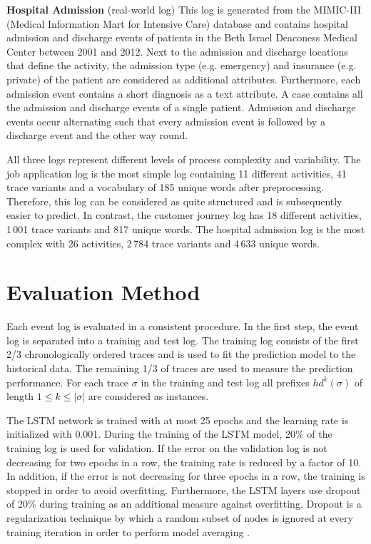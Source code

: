 \textbf{Hospital Admission} (real-world log) This log is generated from the MIMIC-III (Medical Information Mart for Intensive Care) database \cite{johnson2016mimic} and contains hospital admission and discharge events of patients in the Beth Israel Deaconess Medical Center between 2001 and 2012.
Next to the admission and discharge locations that define the activity, the admission type (e.g. emergency) and insurance (e.g. private) of the patient are considered as additional attributes.
Furthermore, each admission event contains a short diagnosis as a text attribute.
A case contains all the admission and discharge events of a single patient.
Admission and discharge events occur alternating such that every admission event is followed by a discharge event and the other way round.

All three logs represent different levels of process complexity and variability.
The job application log is the most simple log containing 11 different activities, 41 trace variants and a vocabulary of 185 unique words after preprocessing.
Therefore, this log can be considered as quite structured and is subsequently easier to predict.
In contrast, the customer journey log has 18 different activities, 1\,001 trace variants and 817 unique words.
The hospital admission log is the most complex with 26 activities, 2\,784 trace variants and 4\,633 unique words.

\section{Evaluation Method}

Each event log is evaluated in a consistent procedure.
In the first step, the event log is separated into a training and test log. 
The training log consists of the first 2/3 chronologically ordered traces and is used to fit the prediction model to the historical data.
The remaining 1/3 of traces are used to measure the prediction performance.
For each trace $\sigma$ in the training and test log all prefixes $hd^k(\sigma)$ of length $1 \leq k \leq |\sigma|$ are considered as instances.

The LSTM network is trained with at most 25 epochs and the learning rate is initialized with 0.001.
During the training of the LSTM model, 20\% of the training log is used for validation.
If the error on the validation log is not decreasing for two epochs in a row, the training rate is reduced by a factor of 10.
In addition, if the error is not decreasing for three epochs in a row, the training is stopped in order to avoid overfitting.
Furthermore, the LSTM layers use dropout of 20\% during training as an additional measure against overfitting.
Dropout is a regularization technique by which a random subset of nodes is ignored at every training iteration in order to perform model averaging \cite{DBLP:journals/corr/abs-1207-0580}.

